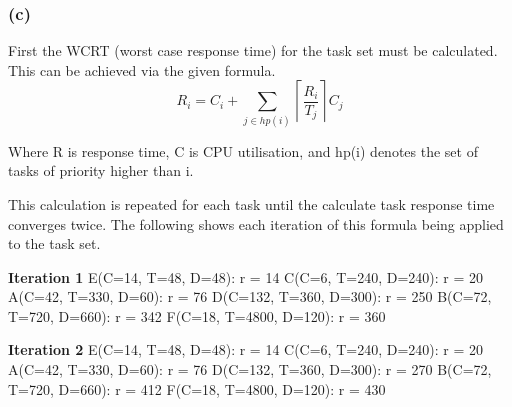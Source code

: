 \documentclass[]{report}
\begin{document}
			
			
			
			\subsubsection{(c)}
			First the WCRT (worst case response time) for the task set must be calculated. This can be achieved via the given formula.
			\begin{equation*}
			R_i = C_i + \sum_{j \in hp(i)} \left\lceil \frac{R_i}{T_j} \right\rceil C_j
			\end{equation*}
			
			Where R is response time, C is CPU utilisation, and hp(i) denotes the set of tasks of priority higher than i.

			This calculation is repeated for each task until the calculate task response time converges twice. The following shows each iteration of this formula being applied to the task set.
			\medskip

			\textbf{Iteration 1} \newline
			E(C=14, T=48, D=48): r = 14 \newline
			C(C=6, T=240, D=240): r = 20 \newline
			A(C=42, T=330, D=60): r = 76 \newline
			D(C=132, T=360, D=300): r = 250 \newline
			B(C=72, T=720, D=660): r = 342 \newline
			F(C=18, T=4800, D=120): r = 360 \newline
	
			\textbf{Iteration 2} \newline
			E(C=14, T=48, D=48): r = 14 \newline
			C(C=6, T=240, D=240): r = 20 \newline
			A(C=42, T=330, D=60): r = 76 \newline
			D(C=132, T=360, D=300): r = 270 \newline
			B(C=72, T=720, D=660): r = 412 \newline
			F(C=18, T=4800, D=120): r = 430 \newline
	
\end{document}

